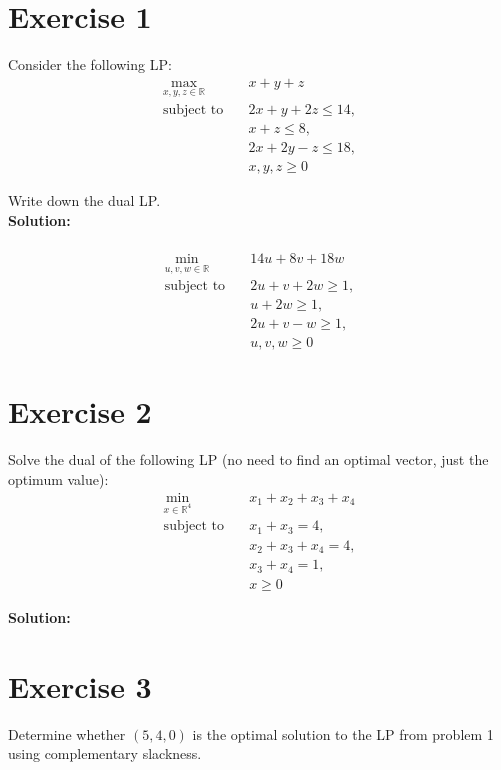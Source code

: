 \documentclass{article}
\begin{document}
\section*{Exercise 1}
Consider the following LP:
\begin{align*}
\max_{x, y, z \in \mathbb{R}} \quad & x + y + z \\
\text{subject to} \quad & 2x + y + 2z \leq 14, \\
& x + z \leq 8, \\
& 2x + 2y - z \leq 18, \\
& x, y, z \geq 0
\end{align*}

Write down the dual LP. \\

\textbf{Solution:} \\

 \\
\begin{align*}
\min_{u, v, w \in \mathbb{R}} \quad & 14u + 8v + 18w \\
\text{subject to} \quad & 2u + v + 2w \geq 1, \\
& u + 2w \geq 1, \\
& 2u + v - w \geq 1, \\
& u, v, w \geq 0
\end{align*}

\newpage

\section*{Exercise 2}
Solve the dual of the following LP (no need to find an optimal vector, just the optimum value):
\begin{align*}
\min_{x \in \mathbb{R}^4} \quad & x_1 + x_2 + x_3 + x_4 \\
\text{subject to} \quad & x_1 + x_3 = 4, \\
& x_2 + x_3 + x_4 = 4, \\
& x_3 + x_4 = 1, \\
& x \geq 0
\end{align*}

\textbf{Solution:}



\newpage

\section*{Exercise 3}
Determine whether $(5, 4, 0)$ is the optimal solution to the LP from problem 1 using complementary slackness. \\
\end{document}
